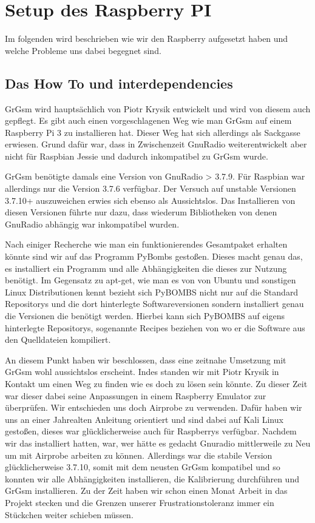 %
%
\chapter{Setup des Raspberry PI}
Im folgenden wird beschrieben wie wir den Raspberry aufgesetzt haben und welche Probleme uns dabei begegnet sind.
\section{Das How To und interdependencies}

GrGsm wird hauptsächlich von Piotr Krysik entwickelt und wird von diesem auch gepflegt. Es gibt auch einen vorgeschlagenen Weg wie man GrGsm auf einem Raspberry Pi 3 zu installieren hat. Dieser Weg hat sich allerdings als Sackgasse erwiesen. Grund dafür war, dass in Zwischenzeit GnuRadio weiterentwickelt aber nicht für Raspbian Jessie und dadurch inkompatibel zu GrGsm wurde. 


GrGsm benötigte damals eine Version von GnuRadio > 3.7.9. Für Raspbian war allerdings nur die Version 3.7.6 verfügbar. Der Versuch auf unstable Versionen 3.7.10+ auszuweichen erwies sich ebenso als Aussichtslos. Das Installieren von diesen Versionen führte nur dazu, dass wiederum Bibliotheken von denen GnuRadio abhängig war inkompatibel wurden. 

Nach einiger Recherche wie man ein funktionierendes Gesamtpaket erhalten könnte sind wir auf das Programm PyBombs gestoßen. Dieses macht genau das, es installiert ein Programm und alle Abhängigkeiten die dieses zur Nutzung benötigt. Im Gegensatz zu apt-get, wie man es von von Ubuntu und sonstigen Linux Distributionen kennt bezieht sich PyBOMBS nicht nur auf die Standard Repositorys und die dort hinterlegte Softwareversionen sondern installiert genau die Versionen die benötigt werden. Hierbei kann sich PyBOMBS auf eigens hinterlegte Repositorys, sogenannte Recipes beziehen von wo er die Software aus den Quelldateien kompiliert. 


An diesem Punkt haben wir beschlossen, dass eine zeitnahe Umsetzung mit GrGsm wohl aussichtslos erscheint. Indes standen wir mit Piotr Krysik in Kontakt um einen Weg zu finden wie es doch zu lösen sein könnte. Zu dieser Zeit war dieser dabei seine Anpassungen in einem Raspberry Emulator zur überprüfen. Wir entschieden uns doch Airprobe zu verwenden. Dafür haben wir uns an einer Jahrealten Anleitung orientiert und sind dabei auf Kali Linux gestoßen, dieses war glücklicherweise auch für Raspberrys verfügbar. Nachdem wir das installiert hatten, war, wer hätte es gedacht Gnuradio mittlerweile zu Neu um mit Airprobe arbeiten zu können. Allerdings war die stabile Version glücklicherweise 3.7.10, somit mit dem neusten GrGsm kompatibel und so konnten wir alle Abhängigkeiten installieren, die Kalibrierung durchführen und GrGsm installieren. Zu der Zeit haben wir schon einen Monat Arbeit in das Projekt stecken und die Grenzen unserer Frustrationstoleranz immer ein Stückchen weiter schieben müssen.

